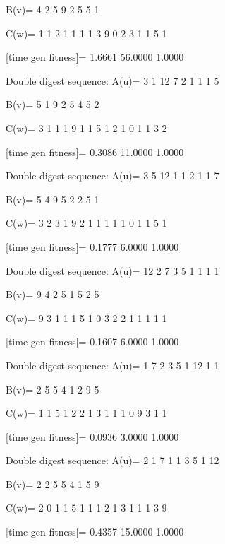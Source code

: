B(v)=
     4     2     5     9     2     5     5     1

C(w)=
     1     1     2     1     1     1     1     3     9     0     2     3     1     1     5     1

[time gen fitness]=
    1.6661   56.0000    1.0000

Double digest sequence:
A(u)=
     3     1    12     7     2     1     1     1     5

B(v)=
     5     1     9     2     5     4     5     2

C(w)=
     3     1     1     1     9     1     1     5     1     2     1     0     1     1     3     2

[time gen fitness]=
    0.3086   11.0000    1.0000

Double digest sequence:
A(u)=
     3     5    12     1     1     2     1     1     7

B(v)=
     5     4     9     5     2     2     5     1

C(w)=
     3     2     3     1     9     2     1     1     1     1     1     0     1     1     5     1

[time gen fitness]=
    0.1777    6.0000    1.0000

Double digest sequence:
A(u)=
    12     2     7     3     5     1     1     1     1

B(v)=
     9     4     2     5     1     5     2     5

C(w)=
     9     3     1     1     1     5     1     0     3     2     2     1     1     1     1     1

[time gen fitness]=
    0.1607    6.0000    1.0000

Double digest sequence:
A(u)=
     1     7     2     3     5     1    12     1     1

B(v)=
     2     5     5     4     1     2     9     5

C(w)=
     1     1     5     1     2     2     1     3     1     1     1     0     9     3     1     1

[time gen fitness]=
    0.0936    3.0000    1.0000

Double digest sequence:
A(u)=
     2     1     7     1     1     3     5     1    12

B(v)=
     2     2     5     5     4     1     5     9

C(w)=
     2     0     1     1     5     1     1     1     2     1     3     1     1     1     3     9

[time gen fitness]=
    0.4357   15.0000    1.0000

